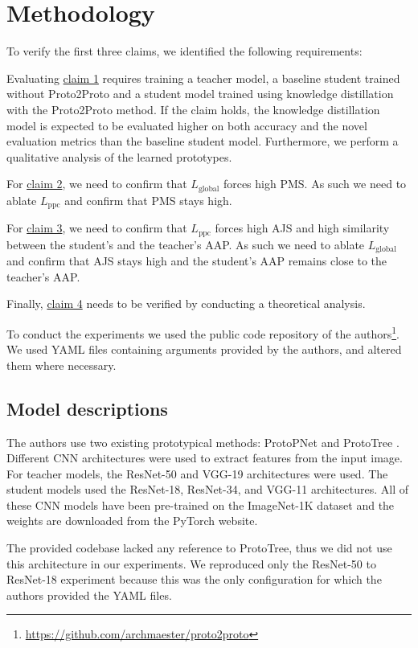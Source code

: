 \section{Methodology} \label{sec:method}
To verify the first three claims, we identified the following requirements:

Evaluating \hyperlink{claim1}{claim 1} requires training a teacher model, a baseline student trained without Proto2Proto and a student model trained using knowledge distillation with the \linebreak Proto2Proto method. If the claim holds, the knowledge distillation model is expected to be evaluated higher on both accuracy and the novel evaluation metrics than the baseline student model. Furthermore, we perform a qualitative analysis of the learned prototypes.

For \hyperlink{claim2}{claim 2}, we need to confirm that $L_{\text{global}}$ forces high PMS. As such we need to ablate $L_{\text{ppc}}$ and confirm that PMS stays high.

For \hyperlink{claim3}{claim 3}, we need to confirm that $L_{\text{ppc}}$ forces high AJS and high similarity between the student's and the teacher's AAP. As such we need to ablate $L_{\text{global}}$ and confirm that AJS stays high and the student's AAP remains close to the teacher's AAP.

Finally, \hyperlink{claim4}{claim 4} needs to be verified by conducting a theoretical analysis.


To conduct the experiments we used the public code repository of the authors\footnote{\url{https://github.com/archmaester/proto2proto}\label{p2pgithub}}. We used YAML files containing arguments provided by the authors, and altered them where necessary.

\subsection{Model descriptions}
The authors use two existing prototypical methods: ProtoPNet \citep{chen2019this} and ProtoTree \citep{nauta2021neural}. Different CNN architectures were used to extract features from the input image. For teacher models, the ResNet-50 and VGG-19 architectures were used. The student models used the ResNet-18, ResNet-34, and VGG-11 architectures. All of these CNN models have been pre-trained on the ImageNet-1K dataset and the weights are downloaded from the PyTorch website. 

The provided codebase lacked any reference to ProtoTree, thus we did not use this architecture in our experiments. We reproduced only the ResNet-50 to ResNet-18 experiment because this was the only configuration for which the authors provided the YAML files.



